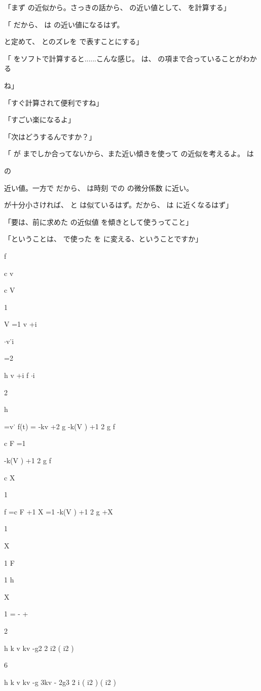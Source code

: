 「まず の近似から。さっきの話から、 の近い値として、 を計算する」\par
「 だから、 は の近い値になるはず。\par
と定めて、 とのズレを で表すことにする」\par
「 をソフトで計算すると......こんな感じ。 は、 の項まで合っていることがわかる\par
ね」\par
「すぐ計算されて便利ですね」\par
「すごい楽になるよ」\par
「次はどうするんですか？」\par
「 が までしか合ってないから、また近い傾きを使って の近似を考えるよ。 は\par
の\par
近い値。⼀⽅で だから、 は時刻 での の微分係数 に近い。\par
が⼗分⼩さければ、 と は似ているはず。だから、 は に近くなるはず」\par
「要は、前に求めた の近似値 を傾きとして使うってこと」\par
「ということは、 で使った を に変える、ということですか」\par
f\par
c v\par
c V\par
1\par
V  =1 v  +i\par
$\cdot$v˙i\par
=2\par
h v  +i f  $\cdot$i\par
2\par
h\par
=v˙ f(t) = -kv +2 g -k(V  ) +1 2 g f\par
c F  =1\par
-k(V  ) +1 2 g f\par
c X\par
1\par
f  =c F +1 X  =1 -k(V  ) +1 2 g +X\par
1\par
X\par
1 F\par
1 h\par
X\par
1 = -  +\par
2\par
h k v kv  -g2 2 i2 ( i2 )\par
6\par
h k v kv  -g 3kv  - 2g3 2 i ( i2 ) ( i2 )\par
